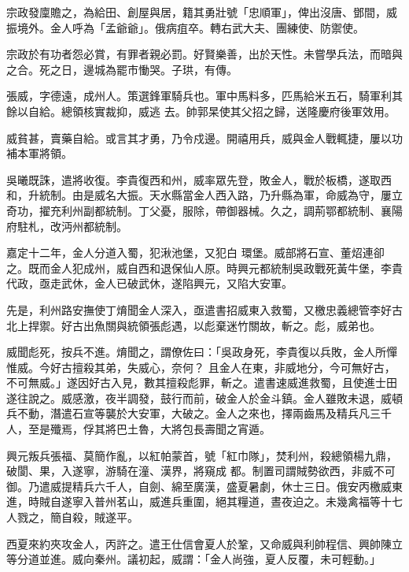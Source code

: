\begin{pinyinscope}
 宗政發廩贍之，為給田、創屋與居，籍其勇壯號「忠順軍」，俾出沒唐、鄧間，威振境外。金人呼為「孟爺爺」。俄病疽卒。轉右武大夫、團練使、防禦使。



 宗政於有功者怨必賞，有罪者親必罰。好賢樂善，出於天性。未嘗學兵法，而暗與之合。死之日，邊城為罷市慟哭。子珙，有傳。



 張威，字德遠，成州人。策選鋒軍騎兵也。軍中馬料多，匹馬給米五石，騎軍利其餘以自給。總領核實裁抑，威逃
 去。帥郭杲使其父招之歸，送隆慶府後軍效用。



 威貧甚，賣藥自給。或言其才勇，乃令戍邊。開禧用兵，威與金人戰輒捷，屢以功補本軍將領。



 吳曦既誅，遣將收復。李貴復西和州，威率眾先登，敗金人，戰於板橋，遂取西和，升統制。由是威名大振。天水縣當金人西入路，乃升縣為軍，命威為守，屢立奇功，擢充利州副都統制。丁父憂，服除，帶御器械。久之，調荊鄂都統制、襄陽府駐札，改沔州都統制。



 嘉定十二年，金人分道入蜀，犯湫池堡，又犯白
 環堡。威部將石宣、董炤連卻之。既而金人犯成州，威自西和退保仙人原。時興元都統制吳政戰死黃牛堡，李貴代政，亟走武休，金人已破武休，遂陷興元，又陷大安軍。



 先是，利州路安撫使丁焴聞金人深入，亟遣書招威東入救蜀，又檄忠義總管李好古北上捍禦。好古出魚關與統領張彪遇，以彪棄迷竹關故，斬之。彪，威弟也。



 威聞彪死，按兵不進。焴聞之，謂僚佐曰：「吳政身死，李貴復以兵敗，金人所憚惟威。今好古擅殺其弟，失威心，奈何？
 且金人在東，非威地分，今可無好古，不可無威。」遂因好古入見，數其擅殺彪罪，斬之。遣書速威進救蜀，且使進士田遂往說之。威感激，夜半調發，鼓行而前，破金人於金斗鎮。金人雖敗未退，威頓兵不動，潛遣石宣等襲於大安軍，大破之。金人之來也，擇兩齒馬及精兵凡三千人，至是殲焉，俘其將巴土魯，大將包長壽聞之宵遁。



 興元叛兵張福、莫簡作亂，以紅帕蒙首，號「紅巾隊」，焚利州，殺總領楊九鼎，破閬、果，入遂寧，游騎在潼、漢界，將窺成
 都。制置司謂賊勢欲西，非威不可御。乃遣威提精兵六千人，自劍、綿至廣漢，盛夏暑劇，休士三日。俄安丙檄威東進，時賊自遂寧入普州茗山，威進兵重圍，絕其糧道，晝夜迫之。未幾禽福等十七人戮之，簡自殺，賊遂平。



 西夏來約夾攻金人，丙許之。遣王仕信會夏人於鞏，又命威與利帥程信、興帥陳立等分道並進。威向秦州。議初起，威謂：「金人尚強，夏人反覆，未可輕動。」




\end{pinyinscope}
